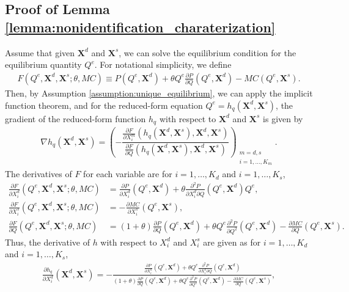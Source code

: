 \documentclass[11pt, a4paper]{article}
\begin{document}
\subsection{Proof of Lemma \ref{lemma:nonidentification_charaterization}}
Assume that given $\bm{X}^{d}$ and $\bm{X}^{s}$, we can solve the equilibrium condition for the equilibrium quantity $Q^e$.
For notational simplicity, we define
\begin{align}
    F(Q^e, \bm{X}^{d}, \bm{X}^{s}; \theta, MC) \equiv P(Q^e, \bm{X}^{d}) + \theta Q^e\frac{\partial P}{\partial Q}(Q^e, \bm{X}^{d}) - MC(Q^e, \bm{X}^{s}).
\end{align}
Then, by Assumption \ref{assumption:unique_equilibrium}, we can apply the implicit function theorem, and for the reduced-form equation $Q^e = h_q(\bm{X}^{d}, \bm{X}^{s})$, the gradient of the reduced-form function $h_q$ with respect to $\bm{X}^{d}$ and $\bm{X}^{s}$ is given by
\begin{align}
    \nabla h_q(\bm{X}^{d}, \bm{X}^{s}) =  \left( -\dfrac{\frac{\partial F}{\partial X^{m}_{i}}(h_q(\bm{X}^{d}, \bm{X}^{s}), \bm{X}^{d}, \bm{X}^{s})}{\frac{\partial F}{\partial Q}(h_q(\bm{X}^{d}, \bm{X}^{s}), \bm{X}^{d}, \bm{X}^{s})} \right)_{\substack{m = d, s\\ i = 1, \ldots, K_m}}. \label{eq:foc_derivative_demand_supply}
\end{align}
The derivatives of $F$ for each variable are for $i = 1, \ldots, K_d$ and $i = 1, \ldots, K_s$,
\begin{align}
    \frac{\partial F}{\partial X^{d}_i}(Q^e, \bm{X}^{d}, \bm{X}^{s}; \theta, MC) & =  \frac{\partial P}{\partial X^{d}_i}(Q^e, \bm{X}^{d}) + \theta\frac{\partial^2 P}{\partial X^{d}_i\partial Q}(Q^e, \bm{X}^{d})Q^e,\\
    \frac{\partial F}{\partial X^{s}_i}(Q^e, \bm{X}^{d}, \bm{X}^{s}; \theta, MC) & =  -\frac{\partial MC}{\partial X^{s}_{i}}(Q^e, \bm{X}^{s}), \\
    \frac{\partial F}{\partial Q}(Q^e, \bm{X}^{d}, \bm{X}^{s}; \theta, MC) & = (1+\theta)\frac{\partial P}{\partial Q}(Q^e, \bm{X}^{d}) + \theta Q^e\frac{\partial^2 P}{\partial Q^2}(Q^e, \bm{X}^{d}) - \frac{\partial MC}{\partial Q}(Q^e, \bm{X}^{s}).
\end{align}
Thus, the derivative of $h$ with respect to $X^{d}_i$ and $X^{s}_i$ are given as for $i = 1, \ldots, K_d$ and $i = 1, \ldots, K_s$,
\begin{align}
    \frac{\partial h_q}{\partial X^{d}_i}(\bm{X}^{d}, \bm{X}^{s}) = -\frac{\frac{\partial P}{\partial X^{d}_i}(Q^e, \bm{X}^{d}) + \theta Q^e \frac{\partial^2 P}{\partial X^{d}_i\partial Q}(Q^e, \bm{X}^{d}) }{(1+\theta)\frac{\partial P}{\partial Q}(Q^e, \bm{X}^{d}) + \theta  Q^e\frac{\partial^2 P}{\partial Q^2}(Q^e, \bm{X}^{d}) - \frac{\partial MC}{\partial Q}(Q^e, \bm{X}^{s})}, \label{eq:foc_derivative_demand}
\end{align}
\end{document}
